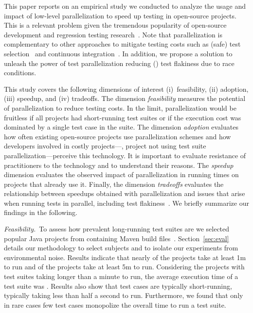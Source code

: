 \documentclass[10pt,journal,compsoc]{IEEEtran}
\begin{document}
This paper reports on an empirical study we conducted to analyze the
usage and impact of low-level parallelization to speed up testing in
open-source projects.  This is a relevant problem given the tremendous
popularity of open-source development and regression testing
research~\cite{yoo-harman-stvr2012}.  Note that parallelization is
complementary to other approaches to mitigate testing costs such as
(safe) test
selection~\cite{Rothermel:1997:SER:248233.248262,gligoric-etal-issta2015}
and continuous
integration~\cite{Saff:2003:RWD:951952.952340}. In addition, we propose a solution to unleash the power of
test parallelization reducing () test flakiness due
to race conditions.

This study covers the following dimensions of interest
(i)~feasibility, (ii) adoption, (iii) speedup, and (iv) tradeoffs.
The dimension \emph{feasibility} measures the potential of
parallelization to reduce testing costs.  In the limit,
parallelization would be fruitless if all projects had short-running
test suites or if the execution cost was dominated by a single test
case in the suite.  The dimension \emph{adoption} evaluates how often
existing open-source projects use parallelization schemes and how
developers involved in costly projects---\ie{}, project not using test suite
parallelization---perceive this technology.  It is important to evaluate
resistance of practitioners to the technology and to understand their
reasons.  The \emph{speedup} dimension evaluates the observed impact
of parallelization in running times on projects that already use it.  Finally, the dimension
\emph{tradeoffs} evaluates the relationship between speedups obtained
with parallelization and issues that arise when running tests in
parallel, including test
flakiness~\cite{luo-etal-fse2014,bell-etal-esecfse2015}.  We briefly
summarize our findings in the following.


\noindent\emph{Feasibility.}~To assess how prevalent long-running test suites
are we selected \numSubjs{} popular Java projects from \github{} containing
Maven build files~\cite{maven}.  Section~\ref{sec:eval} details our methodology
to select subjects and to isolate our experiments from environmental noise.
Results indicate that nearly \percentMedLongRunning{} of the projects take at
least 1m to run and \percentLongRunning{} of the projects take at least 5m to
run.  Considering the \numMedLong{} projects with test suites taking longer than
a minute to run, the average execution time of a test suite was
\averageMedLongRunning{}.  Results also show that test cases are typically
short-running, typically taking less than half a second to run.  Furthermore, we
found that only in rare cases few test cases monopolize the overall time to run
a test suite.
\end{document}
